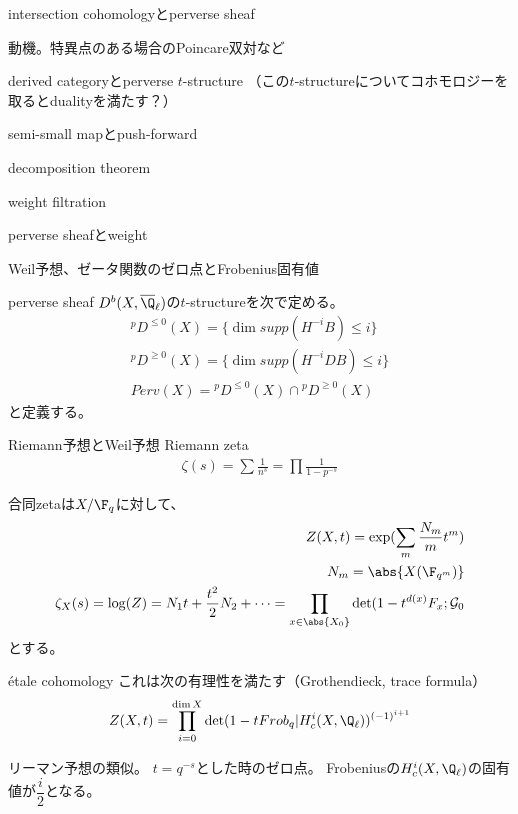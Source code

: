 \documentclass[dvipdfmx]{beamer}
\begin{document}
\begin{frame}{intersection cohomologyとperverse sheaf}

  動機。特異点のある場合のPoincare双対など

  derived categoryとperverse $t$-structure
  （この$t$-structureについてコホモロジーを取るとdualityを満たす？）

  semi-small mapとpush-forward

  decomposition theorem

  weight filtration

  perverse sheafとweight

  Weil予想、ゼータ関数のゼロ点とFrobenius固有値
\end{frame}

\begin{frame}{perverse sheaf}
  $D^b(X,\overline{\Q}_\ell)$の$t$-structureを次で定める。
  \begin{align*}
    {}^pD^{\leq 0}(X)=\{\dim supp(H^{-i}B)\leq i\}\\
    {}^pD^{\geq 0}(X)=\{\dim supp(H^{-i}DB)\leq i\}\\
    Perv(X)={}^pD^{\leq0}(X)\cap{}^pD^{\geq0}(X)
  \end{align*}
  と定義する。
\end{frame}

\begin{frame}{Riemann予想とWeil予想}
  Riemann zeta
  \begin{align*}
    \zeta(s)=\sum\frac{1}{n^s}=\prod\frac{1}{1-p^{-s}}
  \end{align*}

  合同zetaは$X/\F_q$に対して、
  \begin{align*}
    Z(X,t)=\exp(\sum_m\frac{N_m}{m}t^m)\\
    N_m=\abs{X(\F_{q^m})}\\
    \zeta_X(s)=\log(Z)=N_1t+\frac{t^2}{2}N_2+\cdots=
    \prod_{x\in\abs{X_0}}\det(1-t^{d(x)}F_x;\mathcal{G}_0
  \end{align*}
  とする。
\end{frame}

\begin{frame}{\'etale cohomology}
  これは次の有理性を満たす（Grothendieck, trace formula）
  \begin{align*}
    Z(X,t)=\prod_{i=0}^{\dim X}\det(1-tFrob_q\vert H^i_c(X,\Q_\ell))^{(-1)^{i+1}}
  \end{align*}

  リーマン予想の類似。
  $t=q^{-s}$とした時のゼロ点。
  Frobeniusの$H^i_c(X,\Q_\ell)$の固有値が$\dfrac{i}{2}$となる。
\end{frame}
\end{document}
